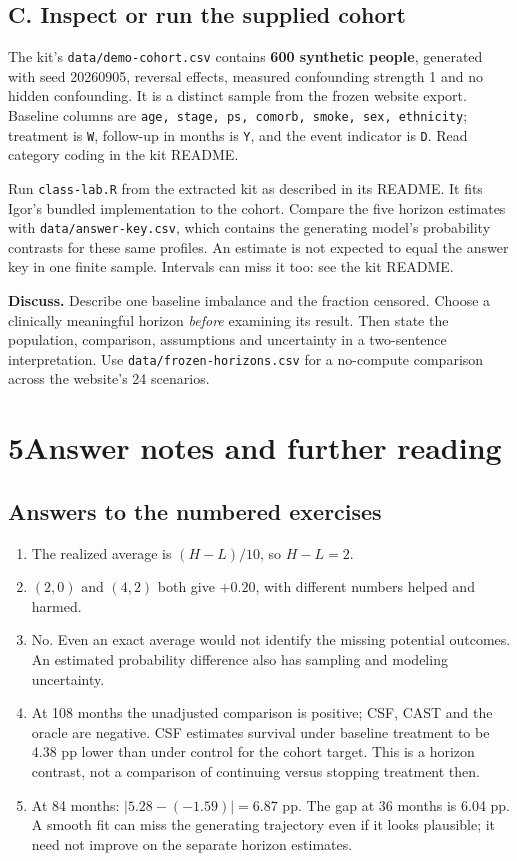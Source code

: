 \documentclass[11pt,letterpaper]{article}
\newcommand{\term}[1]{\textbf{\color{ink}#1}}
\begin{document}
\subsection{C. Inspect or run the supplied cohort}
The kit's \texttt{data/demo-cohort.csv} contains \term{600 synthetic people},
generated with seed 20260905, reversal effects, measured confounding strength
1 and no hidden confounding. It is a distinct sample from the frozen website
export. Baseline columns are \texttt{age, stage, ps, comorb, smoke, sex,
ethnicity}; treatment is \texttt{W}, follow-up in months is \texttt{Y}, and
the event indicator is \texttt{D}. Read category coding in the kit README.

Run \texttt{class-lab.R} from the extracted kit as described in its README.
It fits Igor's bundled implementation to the cohort. Compare the five horizon
estimates with \texttt{data/answer-key.csv}, which contains the generating
model's probability contrasts for these same profiles. An estimate is not
expected to equal the answer key in one finite sample. Intervals can miss it
too: see the kit README.

\term{Discuss.} Describe one baseline imbalance and the fraction censored.
Choose a clinically meaningful horizon \emph{before} examining its result.
Then state the population, comparison, assumptions and uncertainty in a
two-sentence interpretation. Use \texttt{data/frozen-horizons.csv} for a
no-compute comparison across the website's 24 scenarios.

\newpage
\section{5\enspace Answer notes and further reading}
\subsection{Answers to the numbered exercises}
\begin{enumerate}
\item The realized average is $(H-L)/10$, so $H-L=2$.
\item $(2,0)$ and $(4,2)$ both give $+0.20$, with different numbers helped
and harmed.
\item No. Even an exact average would not identify the missing potential
outcomes. An estimated probability difference also has sampling and modeling
uncertainty.
\item At 108 months the unadjusted comparison is positive; CSF, CAST and the
oracle are negative. CSF estimates survival under baseline treatment to be
4.38 pp lower than under control for the cohort target. This is a horizon
contrast, not a comparison of continuing versus stopping treatment then.
\item At 84 months: $|5.28-(-1.59)|=6.87$ pp. The gap at 36 months is
6.04 pp. A smooth fit can miss the generating trajectory even if it looks
plausible; it need not improve on the separate horizon estimates.
\end{enumerate}
\end{document}
